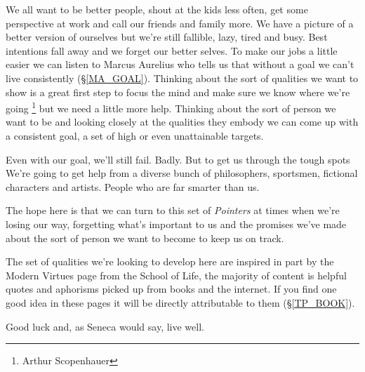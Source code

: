 \cleardoublepage
{\small
We all want to be better people, shout at the kids less often, get some perspective at work and call our friends and family more. We have a picture of a better version of ourselves but we're still fallible, lazy, tired and busy. Best intentions fall away and we forget our better selves. 
To make our jobs a little easier we can listen to Marcus Aurelius who tells us that without a goal we can't live consistently (\S \ref{MA_GOAL}). Thinking about the sort of qualities we want to show is a great first step to focus the mind and make sure we know where we're going \footnote{Arthur Scopenhauer} but we need a little more help. Thinking about the sort of person we want to be and looking closely at the qualities they embody we can come up with a consistent goal, a set of high or even unattainable targets. 

Even with our goal, we'll still fail. Badly. But to get us through the tough spots We're going to get help from a diverse bunch of philosophers, sportsmen, fictional characters and artists. People who are far smarter than us. 

The hope here is that we can turn to this set of \emph{Pointers} at times when we're losing our way, forgetting what's important to us and the promises we've made about the sort of person we want to become to keep us on track.

The set of qualities we're looking to develop here are inspired in part by the Modern Virtues page from the School of Life, the majority of content is helpful quotes and aphorisms picked up from books and the internet. If you find one good idea in these pages it will be directly attributable to them (\S \ref{TP_BOOK}). 

Good luck and, as Seneca would say, live well.

}